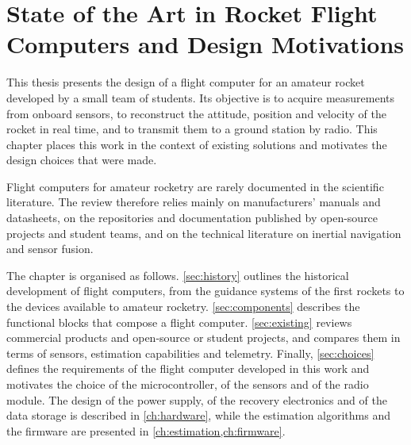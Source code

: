 
\graphicspath{{chapters/1/figures/}}

\chapter[State of the Art and Design Motivations]{State of the Art in Rocket Flight Computers and Design Motivations}
\label{ch:state-of-the-art}

This thesis presents the design of a flight computer for an amateur rocket developed by a small team of students. Its objective is to acquire measurements from onboard sensors, to reconstruct the attitude, position and velocity of the rocket in real time, and to transmit them to a ground station by radio. This chapter places this work in the context of existing solutions and motivates the design choices that were made.

Flight computers for amateur rocketry are rarely documented in the scientific literature. The review therefore relies mainly on manufacturers' manuals and datasheets, on the repositories and documentation published by open-source projects and student teams, and on the technical literature on inertial navigation and sensor fusion. 

The chapter is organised as follows. \cref{sec:history} outlines the historical development of flight computers, from the guidance systems of the first rockets to the devices available to amateur rocketry. \cref{sec:components} describes the functional blocks that compose a flight computer. \cref{sec:existing} reviews commercial products and open-source or student projects, and compares them in terms of sensors, estimation capabilities and telemetry. Finally, \cref{sec:choices} defines the requirements of the flight computer developed in this work and motivates the choice of the microcontroller, of the sensors and of the radio module. The design of the power supply, of the recovery electronics and of the data storage is described in \cref{ch:hardware}, while the estimation algorithms and the firmware are presented in \cref{ch:estimation,ch:firmware}.









